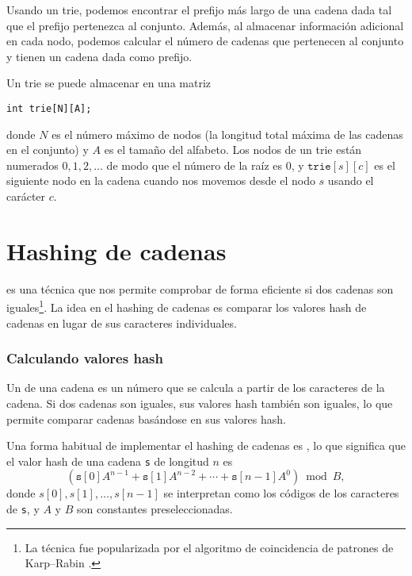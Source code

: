Usando un trie, podemos encontrar
el prefijo más largo de una cadena dada
tal que el prefijo pertenezca al conjunto.
Además, al almacenar información adicional
en cada nodo,
podemos calcular el número de
cadenas que pertenecen al conjunto y tienen un
cadena dada como prefijo.

Un trie se puede almacenar en una matriz
\begin{lstlisting}
int trie[N][A];
\end{lstlisting}
donde $N$ es el número máximo de nodos
(la longitud total máxima de las cadenas en el conjunto)
y $A$ es el tamaño del alfabeto.
Los nodos de un trie están numerados
$0,1,2,\ldots$ de modo que el número de la raíz es 0,
y $\texttt{trie}[s][c]$ es el siguiente nodo en la cadena
cuando nos movemos desde el nodo $s$ usando el carácter $c$.

\section{Hashing de cadenas}


 es una técnica que
nos permite comprobar de forma eficiente si dos
cadenas son iguales\footnote{La técnica
fue popularizada por el algoritmo de coincidencia de patrones de Karp–Rabin
\cite{kar87}.}.
La idea en el hashing de cadenas es comparar los valores hash de
cadenas en lugar de sus caracteres individuales.

\subsubsection*{Calculando valores hash}


Un  de una cadena es
un número que se calcula a partir de los caracteres
de la cadena.
Si dos cadenas son iguales,
sus valores hash también son iguales,
lo que permite comparar cadenas
basándose en sus valores hash.

Una forma habitual de implementar el hashing de cadenas
es , lo que significa
que el valor hash de una cadena \texttt{s}
de longitud $n$ es
\[(\texttt{s}[0] A^{n-1} + \texttt{s}[1] A^{n-2} + \cdots + \texttt{s}[n-1] A^0) \bmod B  ,\]
donde $s[0],s[1],\ldots,s[n-1]$
se interpretan como los códigos de los caracteres de \texttt{s},
y $A$ y $B$ son constantes preseleccionadas.

